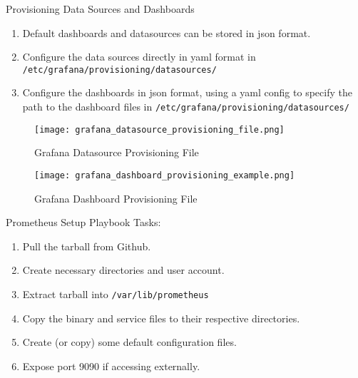 \documentclass[14pt,compress,usenames,dvipsnames,aspectratio=169]{beamer}
\begin{document}
\begin{frame}{Provisioning Data Sources and Dashboards}
    \begin{enumerate}
        \item{Default dashboards and datasources can be stored in json format.}
        \item{Configure the data sources directly in yaml format in
            \texttt{/etc/grafana/provisioning/datasources/} }
        \item{Configure the dashboards in json format, using a yaml config to 
                specify the path to the dashboard files in 
                \texttt{/etc/grafana/provisioning/datasources/} }

    \end{enumerate}
\end{frame}

\begin{figure}
    \centering
    \texttt{[image: grafana\_datasource\_provisioning\_file.png]}
    \caption{Grafana Datasource Provisioning File}
    \label{fig:enter-label}
\end{figure}

\begin{figure}
    \centering
    \texttt{[image: grafana\_dashboard\_provisioning\_example.png]}
    \caption{Grafana Dashboard Provisioning File}
    \label{fig:enter-label}
\end{figure}

\begin{frame}{Prometheus Setup Playbook}
    Tasks:
    \begin{enumerate}
        \item{Pull the tarball from Github.} 
        \item{Create necessary directories and user account.} 
        \item{Extract tarball into \texttt{/var/lib/prometheus} } 
        \item{Copy the binary and service files to their respective directories.} 
        \item{Create (or copy) some default configuration files.} 
        \item{Expose port 9090 if accessing externally.} 
    \end{enumerate}
\end{frame}
\end{document}
